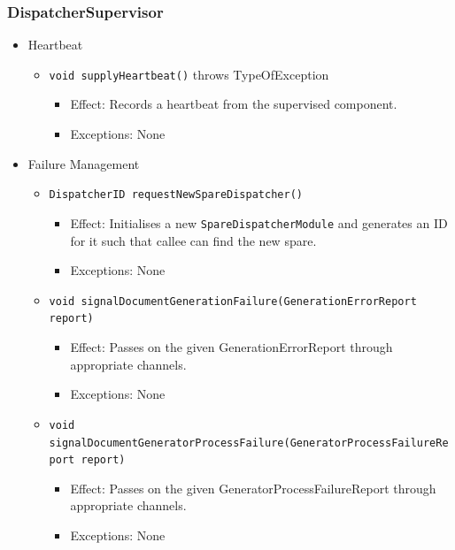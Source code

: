 \documentclass[a4paper,10pt]{article}
\begin{document}
\subsubsection*{DispatcherSupervisor}
\begin{itemize}
	\item Heartbeat
	\begin{itemize}
		\item \texttt{void supplyHeartbeat()} throws TypeOfException
		\begin{itemize}
			\item Effect: Records a heartbeat from the supervised component.
			\item Exceptions: None
		\end{itemize}
	\end{itemize}
\end{itemize}

\begin{itemize}
	\item Failure Management
	\begin{itemize}
		\item \texttt{DispatcherID requestNewSpareDispatcher()}
		\begin{itemize}
			\item Effect: Initialises a new \texttt{SpareDispatcherModule} and generates an ID for it such that callee can find the new spare.
			\item Exceptions: None
		\end{itemize}

	    \item \texttt{void signalDocumentGenerationFailure(GenerationErrorReport report)}
	    \begin{itemize}
		    \item Effect: Passes on the given GenerationErrorReport through appropriate channels.
		    \item Exceptions: None
	    \end{itemize}

	    \item \texttt{void signalDocumentGeneratorProcessFailure(GeneratorProcessFailureReport report)}
	    \begin{itemize}
		    \item Effect: Passes on the given GeneratorProcessFailureReport through appropriate channels.
		    \item Exceptions: None
	    \end{itemize}
    \end{itemize}
\end{itemize}
\end{document}
